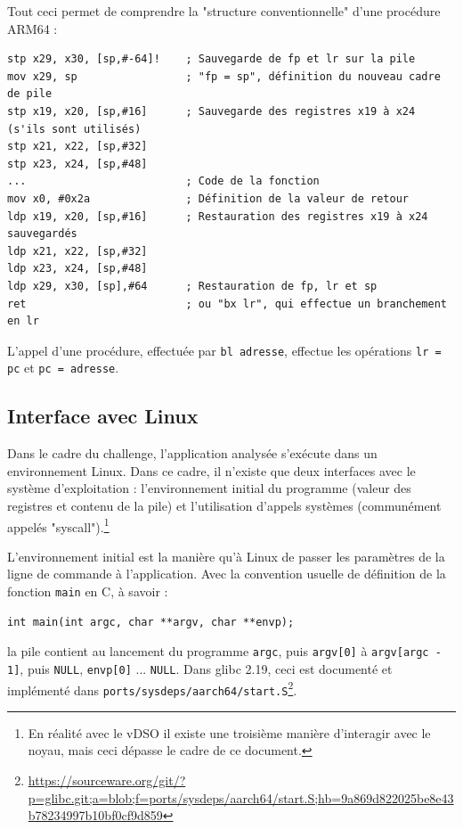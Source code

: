 \documentclass[a4paper,10pt]{article}
\begin{document}
\begin{appendices}
Tout ceci permet de comprendre la "structure conventionnelle" d'une procédure ARM64 :
\begin{verbatim}
stp x29, x30, [sp,#-64]!    ; Sauvegarde de fp et lr sur la pile
mov x29, sp                 ; "fp = sp", définition du nouveau cadre de pile
stp x19, x20, [sp,#16]      ; Sauvegarde des registres x19 à x24 (s'ils sont utilisés)
stp x21, x22, [sp,#32]
stp x23, x24, [sp,#48]
...                         ; Code de la fonction
mov x0, #0x2a               ; Définition de la valeur de retour
ldp x19, x20, [sp,#16]      ; Restauration des registres x19 à x24 sauvegardés
ldp x21, x22, [sp,#32]
ldp x23, x24, [sp,#48]
ldp x29, x30, [sp],#64      ; Restauration de fp, lr et sp
ret                         ; ou "bx lr", qui effectue un branchement en lr
\end{verbatim}

L'appel d'une procédure, effectuée par \texttt{bl adresse}, effectue les opérations \texttt{lr = pc} et \texttt{pc = adresse}.

\subsection{Interface avec Linux}

Dans le cadre du challenge, l'application analysée s'exécute dans un environnement Linux. Dans ce cadre, il n'existe que deux interfaces avec le système d'exploitation : l'environnement initial du programme (valeur des registres et contenu de la pile) et l'utilisation d'appels systèmes (communément appelés "syscall").\footnote{En réalité avec le vDSO il existe une troisième manière d'interagir avec le noyau, mais ceci dépasse le cadre de ce document.}

L'environnement initial est la manière qu'à Linux de passer les paramètres de la ligne de commande à l'application. Avec la convention usuelle de définition de la fonction \texttt{main} en C, à savoir :
\begin{verbatim}
int main(int argc, char **argv, char **envp);
\end{verbatim}
la pile contient au lancement du programme \texttt{argc}, puis \texttt{argv[0]} à \texttt{argv[argc - 1]}, puis \texttt{NULL}, \texttt{envp[0]} ... \texttt{NULL}.
Dans glibc 2.19, ceci est documenté et implémenté dans \texttt{ports/sysdeps/aarch64/start.S}\footnote{\url{https://sourceware.org/git/?p=glibc.git;a=blob;f=ports/sysdeps/aarch64/start.S;hb=9a869d822025be8e43b78234997b10bf0cf9d859}}.


\end{appendices}
\end{document}
